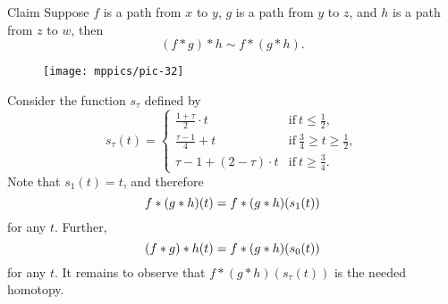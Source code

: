 \begin{thm}{Claim}\label{clm:assoc}
Suppose $f$ is a path from $x$ to $y$, 
$g$ is a path from $y$ to $z$,
and
$h$ is a path from $z$ to $w$,
then
\[(f*g)*h\sim f*(g*h).\]
\end{thm}

\begin{wrapfigure}[3]{r}{30mm}
\centering
\vskip-4mm
\texttt{[image: mppics/pic-32]}
\end{wrapfigure}

Consider the function $s_\tau$ defined by 
\[s_\tau(t)=
\begin{cases}
\tfrac{1+\tau}2\cdot t&\text{if}\ t\le \tfrac12,
\\
\tfrac{\tau-1}4+t&\text{if}\ \tfrac 34\ge t\ge \tfrac12,
\\
\tau-1+ (2-\tau)\cdot t&\text{if}\  t\ge \tfrac34.
\end{cases}
\]
Note that $s_1(t)=t$,
and therefore \[f*(g*h)(t)\z=f*(g*h)(s_1(t))\] for any $t$.
Further, 
\[(f*g)*h(t)\z=f*(g*h)(s_0(t))\] for any $t$.
It remains to observe that $f*(g*h)(s_\tau(t))$ is the needed homotopy.
\qeds
